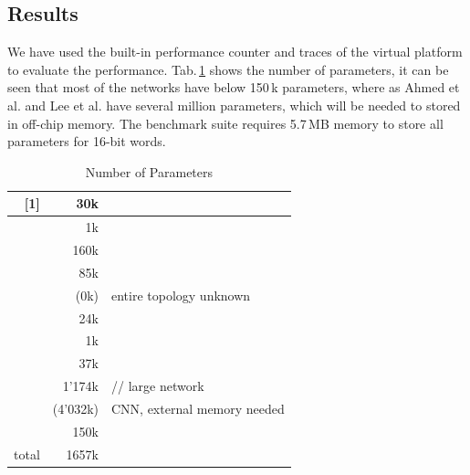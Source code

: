 \subsection{Results}
We have used the built-in performance counter and traces of the virtual platform to evaluate the performance. Tab.\,\ref{tab:numParam} shows the number of parameters, it can be seen that most of the networks have below 150\,k parameters, where as Ahmed et al. \cite{Ahmed2018} and Lee et al. \cite{Lee2018} have several million parameters, which will be needed to stored in off-chip memory. The benchmark suite requires 5.7\,MB memory to store all parameters for 16-bit words.

\begin{table}[h]
\centering
\begin{tabular}{|r|r|l|}
\hline

 [1] &        30k & \\ \hline
 [2] &         1k & \\ \hline
 [3] &       160k & \\ \hline
 [4] &        85k & \\ \hline
 [5] &         (0k) & entire topology unknown \\ \hline
 [6] &        24k & \\ \hline
 [7] &         1k & \\ \hline
 [8] &        37k & \\ \hline
[9] &      1'174k & // large network \\ \hline
[10] &    (4'032k) & CNN, external memory needed  \\ \hline
[11] &       150k & \\ \hline\hline
total &      1657k & \\ \hline
\end{tabular}
\caption{Number of Parameters}\label{tab:numParam}
\end{table}





